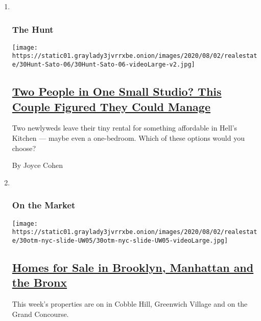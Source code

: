 \begin{enumerate}
\def\labelenumi{\arabic{enumi}.}
\item ~
  \hypertarget{the-hunt}{%
  \subsubsection{The Hunt}\label{the-hunt}}

  \texttt{[image: https://static01.graylady3jvrrxbe.onion/images/2020/08/02/realestate/30Hunt-Sato-06/30Hunt-Sato-06-videoLarge-v2.jpg]}

  \hypertarget{two-people-in-one-small-studio-this-couple-figured-they-could-manage}{%
  \subsection{\texorpdfstring{\href{/interactive/2020/07/30/realestate/30hunt-sato.html}{Two
  People in One Small Studio? This Couple Figured They Could
  Manage}}{Two People in One Small Studio? This Couple Figured They Could Manage}}\label{two-people-in-one-small-studio-this-couple-figured-they-could-manage}}

  Two newlyweds leave their tiny rental for something affordable in
  Hell's Kitchen --- maybe even a one-bedroom. Which of these options
  would you choose?

  By Joyce Cohen
\item ~
  \hypertarget{on-the-market}{%
  \subsubsection{On the Market}\label{on-the-market}}

  \texttt{[image: https://static01.graylady3jvrrxbe.onion/images/2020/08/02/realestate/30otm-nyc-slide-UW05/30otm-nyc-slide-UW05-videoLarge.jpg]}

  \hypertarget{homes-for-sale-in-brooklyn-manhattan-and-the-bronx}{%
  \subsection{\texorpdfstring{\href{/2020/07/30/realestate/homes-for-sale-in-brooklyn-manhattan-and-the-bronx.html}{Homes
  for Sale in Brooklyn, Manhattan and the
  Bronx}}{Homes for Sale in Brooklyn, Manhattan and the Bronx}}\label{homes-for-sale-in-brooklyn-manhattan-and-the-bronx}}

  This week's properties are on in Cobble Hill, Greenwich Village and on
  the Grand Concourse.


\end{enumerate}

